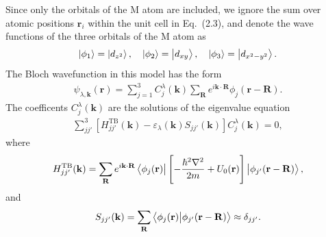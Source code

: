 Since only the orbitals of the M atom are included, we ignore the sum over atomic positions $\mathbf{r}_i$ within the unit cell in Eq.~(2.3), and denote the wave functions of the three orbitals of the M atom as
\begin{gather}
	\ket{\phi_{1}} = \ket{d_{z^{2}}} , \quad \ket{\phi_{2}} = \ket{d_{xy}} , \quad \ket{\phi_{3}} = \ket{d_{x^{2} - y^{2}}}.
\end{gather}
The Bloch wavefunction in this model has the form
\begin{gather}
	\psi_{\lambda,\mathbf{k}}(\mathbf{r}) = \sum_{j=1}^{3} C_{j}^{\lambda}(\mathbf{k}) \sum_{\mathbf{R}} e^{i \mathbf{k \cdot R}} \phi_{j}(\mathbf{r} - \mathbf{R}).
\end{gather}
The coefficents $C_{j}^{\lambda}(\mathbf{k})$ are the solutions of the eigenvalue equation
\begin{gather}
	\sum_{jj'}^{3} \left[H_{jj'}^{\text{TB}}(\mathbf{k}) - \varepsilon_{\lambda}(\mathbf{k}) S_{jj'}(\mathbf{k})\right] C_{j}^{\lambda}(\mathbf{k}) = 0,
\end{gather}
where
\begin{equation}
	\begin{aligned}
		H_{jj'}^{\text{TB}}(\mathbf{k}) = \sum_{\mathbf{R}} e^{i \mathbf{k \cdot R}} \bra{\phi_{j}(\mathbf{r})} \left[-\dfrac{\hbar^{2} \nabla^{2}}{2m} + U_{0}(\mathbf{r})\right] \ket{\phi_{j'}(\mathbf{r - R})},
	\end{aligned}
\end{equation}
and
\begin{equation}
	\begin{aligned}
		S_{jj'}(\mathbf{k}) = \sum_{\mathbf{R}} \bra{\phi_{j}(\mathbf{r})} \ket{\phi_{j'}(\mathbf{r - R})} \approx \delta_{jj'}.
	\end{aligned}
\end{equation}

